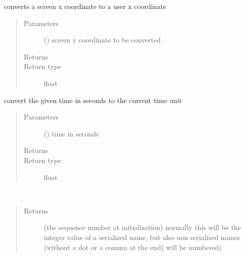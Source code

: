 \documentclass[letterpaper,10pt,english]{sphinxmanual}
\begin{document}
\begin{fulllineitems}
\begin{fulllineitems}
\label{\detokenize{Reference:salabim.Environment.screen_to_usercoordinates_y}}
converts a screen x coordinate to a user x coordinate
\begin{quote}\begin{description}
\item[{Parameters}] \leavevmode
{} () \textendash{} screen y coordinate to be converted

\item[{Returns}] \leavevmode
{}

\item[{Return type}] \leavevmode
float

\end{description}\end{quote}

\end{fulllineitems}


\begin{fulllineitems}
\label{\detokenize{Reference:salabim.Environment.seconds}}
convert the given time in seconds to the current time unit
\begin{quote}\begin{description}
\item[{Parameters}] \leavevmode
{} () \textendash{} time in seconds

\item[{Returns}] \leavevmode
{}

\item[{Return type}] \leavevmode
float

\end{description}\end{quote}

\end{fulllineitems}


\begin{fulllineitems}
\label{\detokenize{Reference:salabim.Environment.sequence_number}}~\begin{quote}\begin{description}
\item[{Returns}] \leavevmode
{} \textendash{} (the sequence number at initialization) 
normally this will be the integer value of a serialized name,
but also non serialized names (without a dot or a comma at the end)
will be numbered)


\end{description}
\end{quote}
\end{fulllineitems}
\end{fulllineitems}
\end{document}
